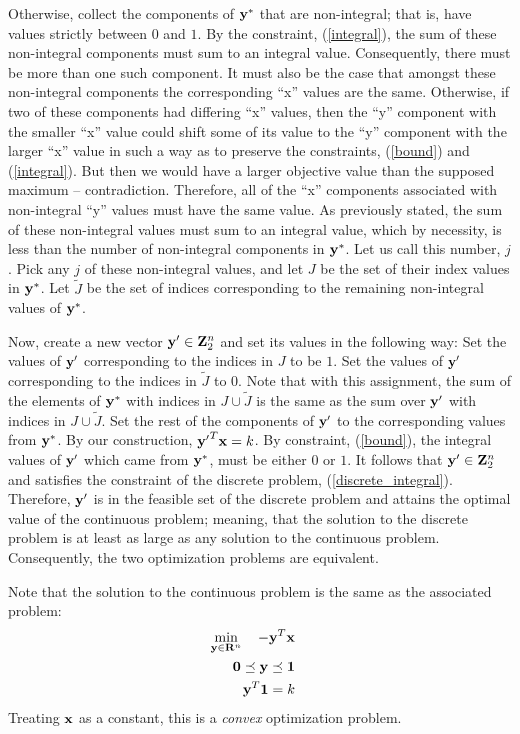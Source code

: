 \documentclass[12pt]{article}
\begin{document}
Otherwise, collect the components of ${\bf y}^*$ 
that are non-integral; that is, have values strictly between $0$ and $1$.
By the constraint, (\ref{integral}), the sum of these non-integral components
must sum to an integral value. Consequently, there must be more than one such
component. It must also be the case that amongst these non-integral components 
the corresponding ``x'' values are the same. Otherwise, if two of these components 
had differing ``x'' values, then the ``y'' component with the 
smaller ``x'' value could shift some of its value to the ``y'' component with 
the larger ``x'' value in such a way as to preserve the constraints, 
(\ref{bound}) and (\ref{integral}). 
But then we would have a larger objective value than the supposed maximum 
-- contradiction. Therefore, all of the 
``x'' components associated with non-integral ``y'' values must have the same 
value. As previously stated, the sum of these non-integral values must sum 
to an integral value, which by necessity, is less than the number of 
non-integral components in ${\bf y}^*$. Let us call this number, $j$. 
Pick any $j$ of these non-integral values, and let $J$ be the set of their index
values in ${\bf y}^*$.
Let ${\tilde J}$ be the set of indices corresponding to the remaining non-integral values
of ${\bf y}^*$.

Now, create a new 
vector ${\bf y}^\prime \in {\bf Z}_2^n$ and set its values in the following way: 
Set the values of ${\bf y}^\prime$ corresponding to the indices in $J$
to be $1$. Set the values of ${\bf y}^\prime$ corresponding to the indices in ${\tilde J}$
to $0$. Note that with this assignment, the sum of the elements of 
${\bf y}^*$ with indices in $J \cup {\tilde J}$ is the same as the sum over ${\bf y}^\prime$ 
with indices in $J \cup {\tilde J}$.
Set the rest of the components of ${\bf y}^\prime$ to the 
corresponding values from ${\bf y}^*$. By our construction, 
${{\bf y}^\prime}^T {\bf x} = k$. By constraint, (\ref{bound}), the integral 
values of ${\bf y}^\prime$ which came from ${\bf y}^*$, must
be either $0$ or $1$. It follows that ${\bf y}^\prime \in {\bf Z}_2^n$ and 
satisfies the constraint of the discrete problem, (\ref{discrete_integral}). 
Therefore, ${\bf y}^\prime$ is in the feasible set of the discrete problem and 
attains the optimal value of the continuous problem; meaning, that the 
solution to the discrete problem is at least as large as any solution to the 
continuous problem. Consequently, the two optimization problems are equivalent.

Note that the solution to the continuous problem is the same as the associated problem:
\begin{eqnarray}
	\mathop{\rm min}_{{\bf y} \in {\bf R}^n}\limits \quad -{\bf y}^T {\bf x} && \label{op1} \\ 
	{\bf 0} \preceq {\bf y} \preceq {\bf 1} &&  \label{op2}\\
	{\bf y}^T {\bf 1} =  k \label{op3} &&
\end{eqnarray}
Treating ${\bf x}$ as a constant, this is a {\it convex\/} optimization problem.
\end{document}
